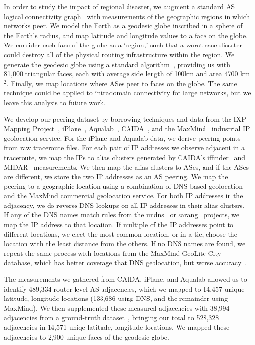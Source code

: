     In order to study the impact of regional disaster, we augment a standard AS logical connectivity graph~\cite{caida-asgraph} with measurements of the geographic regions in which networks peer.
    We model the Earth as a geodesic globe inscribed in a sphere of the Earth's radius, and map latitude and longitude values to a face on the globe.
    We consider each face of the globe as a `region,' such that a worst-case disaster could destroy all of the physical routing infrastructure within the region.
    We generate the geodesic globe using a standard algorithm~\cite{geodesic}, providing us with 81,000 triangular faces, each with average side length of 100km and area 4700 km$^2$.  
    Finally, we map locations where ASes peer to faces on the globe.
    The same technique could be applied to intradomain connectivity for large networks, but we leave this analysis to future work.    
 
    We develop our peering dataset by borrowing techniques and data from
    the IXP
    Mapping Project~\cite{ixps-mapped}, iPlane~\cite{iplane},
    Aqualab~\cite{sidewalk},
    CAIDA~\cite{caidadata}, and the MaxMind~\cite{maxmind} industrial IP geolocation service.
    For the iPlane and Aqualab data, we derive peering points from raw traceroute files.
    For each pair of IP addresses we observe adjacent in a traceroute, we map the IPs to alias clusters generated by CAIDA's iffinder~\cite{iffinder} and MIDAR~\cite{iffinder, midar} measurements.
    We then map the alias clusters to ASes, and if the ASes are different, we store the two IP addresses as an AS peering.
    We map the peering to a geographic location using a combination of DNS-based geolocation and the MaxMind commercial geolocation service.
    For both IP addresses in the adjacency, we do reverse DNS lookups on all IP addresses in their alias clusters. 
    If any of the DNS names match rules from the undns~\cite{undns} or sarang~\cite{sarang} projects, we map the IP address to that location. 
    If multiple of the IP addresses point to different locations, we elect the most common location, or in a tie, choose the location with the least distance from the others.
    If no DNS names are found, we repeat the same process with locations from the MaxMind GeoLite City database, which has better coverage that DNS geolocation, but worse accuracy~\cite{uhlig_ccr_paper}. 
    
    The measurements we gathered from CAIDA, iPlane, and Aqualab allowed us to identify 489,334 router-level AS adjacencies, which we mapped to 14,457 unique latitude, longitude locations (133,686 using DNS, and the remainder using MaxMind).
    We then supplemented these measured adjacencies with 38,994 adjacencies from a ground-truth dataset~\cite{ixps-mapped}, bringing our total to 528,328 adjacencies in 14,571 uniqe latitude, longitude locations. 
    We mapped these adjacencies to 2,900 unique faces of the geodesic globe.   
 
